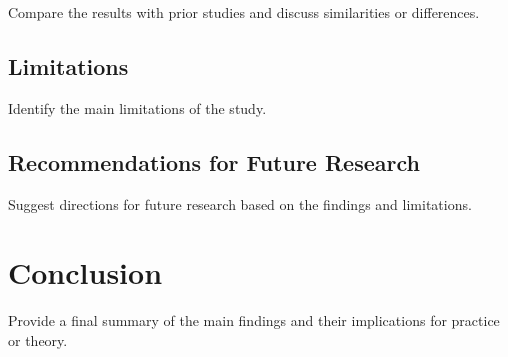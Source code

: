 \documentclass[11pt]{article}
\begin{document}
Compare the results with prior studies and discuss similarities or differences.

\subsection{Limitations}

Identify the main limitations of the study.

\subsection{Recommendations for Future Research}

Suggest directions for future research based on the findings and limitations.

\section{Conclusion}

Provide a final summary of the main findings and their implications for practice or theory.
\end{document}
